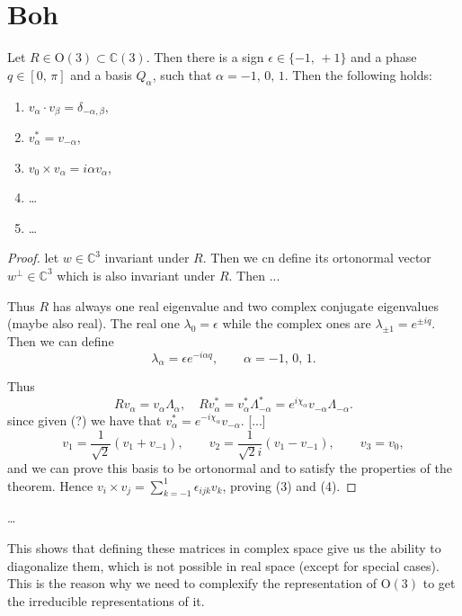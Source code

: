 \chapter{Boh}

\begin{theorem}
    Let \(R \in \mathrm{O}(3) \subset \mathbb{C}(3)\). Then there is a sign \(\epsilon \in \{-1,\,+1\}\) and a phase \(q \in [0,\,\pi]\) and a basis \(Q_{\alpha}\), such that \(\alpha= -1,\,0,\,1\). Then the following holds:
    \begin{enumerate}
        \item \(v_{\alpha} \cdot v_{\beta} = \delta_{-\alpha,\beta}\),
        \item \(v_{\alpha}^* = v_{-\alpha}\),
        \item \(v_0 \times v_{\alpha} = i \alpha v_{\alpha}\),
        \item \dots
        \item \dots
    \end{enumerate}
\end{theorem}

\begin{proof}
    let \(w \in \mathbb{C}^3\) invariant under \(R\). Then we cn define its ortonormal vector \(w^{\bot} \in \mathbb{C}^3\) which is also invariant under \(R\). Then ...

    Thus \(R\) has always one real eigenvalue and two complex conjugate eigenvalues (maybe also real). The real one \(\lambda_0 = \epsilon\) while the complex ones are \(\lambda_{\pm 1} = e^{\pm i q}\). Then we can define
    \[
        \lambda_{\alpha} = \epsilon e^{-i \alpha q}, \qquad \alpha = -1,\,0,\,1.
    \]

    Thus
    \[
        R v_{\alpha} = v_{\alpha} \Lambda_{\alpha}, \quad R v_{\alpha}^* = v_{\alpha}^* \Lambda_{-\alpha}^* =e^{i \chi_\alpha} v_{-\alpha} \Lambda_{-\alpha}.
    \]
    since given (?) we have that \(v_{\alpha}^* = e^{-i \chi_\alpha} v_{-\alpha}\).
        [...]
    \[
        v_1 = \frac{1}{\sqrt{2}}(v_1 + v_{-1}), \qquad v_{2} = \frac{1}{\sqrt{2} i}(v_1 - v_{-1}), \qquad v_3 = v_0,
    \]
    and we can prove this basis to be ortonormal and to satisfy the properties of the theorem. Hence \(v_i \times v_j = \sum_{k=-1}^1 \epsilon_{ijk} v_k\), proving (3) and (4).
\end{proof}

\dots

This shows that defining these matrices in complex space give us the ability to diagonalize them, which is not possible in real space (except for special cases). This is the reason why we need to complexify the representation of \(\mathrm{O}(3)\) to get the irreducible representations of it.


